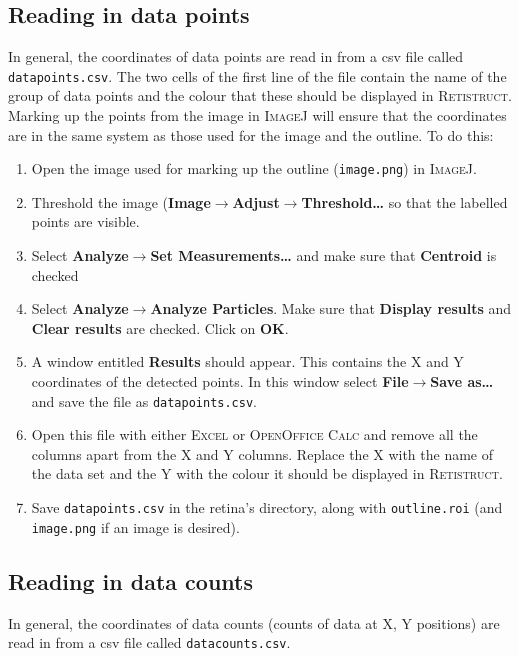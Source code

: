 \documentclass{book}
\begin{document}
\subsection{Reading in data points}
\label{retistruct-user-guide:sec:read-data-points}

In general, the coordinates of data points are read in from a csv file
called \texttt{datapoints.csv}. The two cells of the first line of the
file contain the name of the group of data points and the colour that
these should be displayed in \textsc{Retistruct}.  Marking up the
points from the image in \textsc{ImageJ} will ensure that the
coordinates are in the same system as those used for the image and the
outline. To do this:
\begin{enumerate}
\item Open the image used for marking up the outline
  (\texttt{image.png}) in \textsc{ImageJ}.
\item Threshold the image
  (\textbf{Image$\rightarrow$Adjust$\rightarrow$Threshold\dots} so
  that the labelled points are visible.
\item Select \textbf{Analyze$\rightarrow$Set Measurements\dots} and make
  sure that \textbf{Centroid} is checked
\item Select \textbf{Analyze$\rightarrow$Analyze Particles}. Make sure
  that \textbf{Display results} and \textbf{Clear results} are
  checked. Click on \textbf{OK}.
\item A window entitled \textbf{Results} should appear. This contains
  the X and Y coordinates of the detected points. In this window
  select \textbf{File$\rightarrow$Save as\dots} and save the file as
  \texttt{datapoints.csv}.
\item Open this file with either \textsc{Excel} or \textsc{OpenOffice
    Calc} and remove all the columns apart from the X and Y
  columns. Replace the X with the name of the data set and the Y with
  the colour it should be displayed in \textsc{Retistruct}.
\item Save \texttt{datapoints.csv} in the retina's directory, along
  with \texttt{outline.roi} (and \texttt{image.png} if an image is
  desired).
\end{enumerate}

\subsection{Reading in data counts}
\label{retistruct-user-guide:sec:read-data-counts}

In general, the coordinates of data counts (counts of data at X, Y
positions) are read in from a csv file called \texttt{datacounts.csv}.
\end{document}
